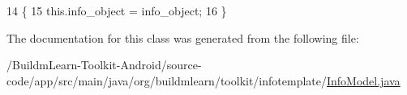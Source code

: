 \begin{DoxyCode}
14                                                    \{
15         this.info\_object = info\_object;
16     \}
\end{DoxyCode}


The documentation for this class was generated from the following file\-:\begin{DoxyCompactItemize}
\item 
/\-Buildm\-Learn-\/\-Toolkit-\/\-Android/source-\/code/app/src/main/java/org/buildmlearn/toolkit/infotemplate/\hyperlink{infotemplate_2InfoModel_8java}{Info\-Model.\-java}\end{DoxyCompactItemize}
